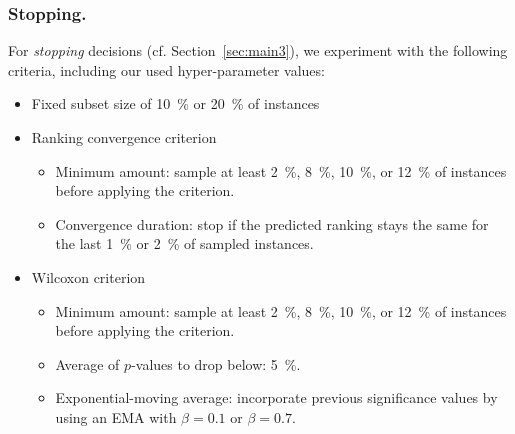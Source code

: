 \documentclass[runningheads]{llncs}
\begin{document}
\subsubsection{Stopping.}
For \emph{stopping} decisions (cf. Section~\ref{sec:main3}), we experiment with the following criteria, including our used hyper-parameter values:
\begin{itemize}
  \item Fixed subset size of \SI{10}{\%} or \SI{20}{\%} of instances
  \item Ranking convergence criterion
  \begin{itemize}
    \item Minimum amount: sample at least \SI{2}{\%}, \SI{8}{\%}, \SI{10}{\%}, or \SI{12}{\%} of instances before applying the criterion.
    \item Convergence duration: stop if the predicted ranking stays the same for the last \SI{1}{\%} or \SI{2}{\%} of sampled instances.
  \end{itemize}

  \item Wilcoxon criterion
  \begin{itemize}
    \item Minimum amount: sample at least \SI{2}{\%}, \SI{8}{\%}, \SI{10}{\%}, or \SI{12}{\%} of instances before applying the criterion.
    \item Average of $p$-values to drop below: \SI{5}{\%}.
    \item Exponential-moving average: incorporate previous significance values by using an EMA with $\beta = 0.1$ or $\beta = 0.7$.
  \end{itemize}
\end{itemize}
\end{document}
